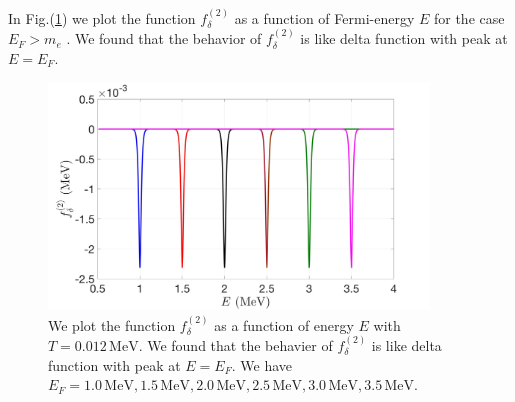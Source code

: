 \documentclass[onecolumn,preprintnumbers,amsmath,amssymb]{revtex4}
\begin{document}
In Fig.(\ref{f_delta_checking}) we plot the function $f^{(2)}_\delta$ as a function of Fermi-energy $E$ for the case $E_F>m_e$ . We found that the behavior of $f^{(2)}_\delta$  is like delta function with peak at $E=E_F$. 
\begin{figure}[t]
\begin{center}
\includegraphics[width=0.9\textwidth]{./plot/f_delta_checking2}
\caption{We plot the function $f^{(2)}_\delta$ as a function of energy $E$ with $T=0.012\,\mathrm{MeV}$. We found that the behavier of $f^{(2)}_\delta$  is like delta function with peak at $E=E_F$. We have  $E_F=1.0\,\mathrm{MeV}, 1.5\,\mathrm{MeV}, 2.0\,\mathrm{MeV},2.5\,\mathrm{MeV}, 3.0\,\mathrm{MeV}, 3.5\,\mathrm{MeV}$.}
\label{f_delta_checking}
\end{center}
\end{figure}


\end{document}

